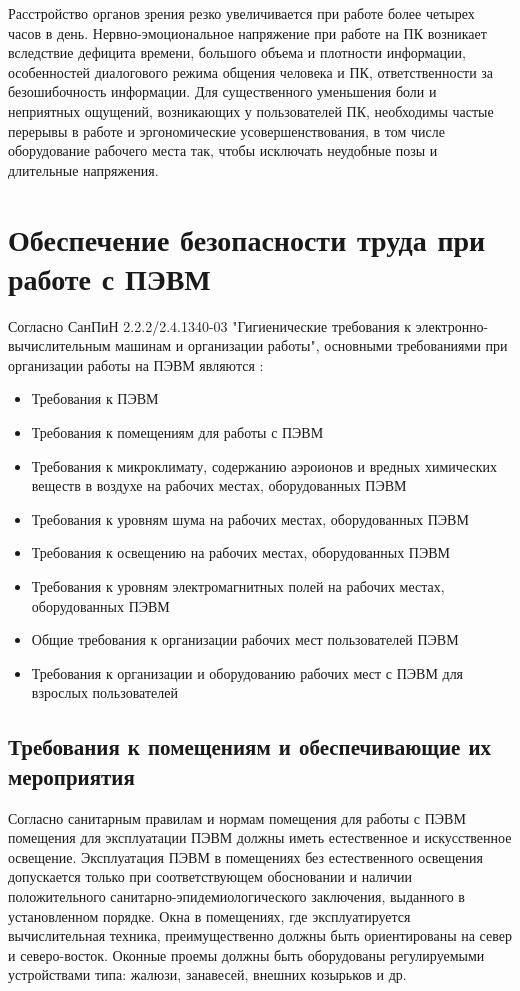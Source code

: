 Расстройство органов зрения резко увеличивается при работе более четырех часов в день. Нервно-эмоциональное напряжение при работе на ПК возникает вследствие дефицита времени, большого объема и плотности информации, особенностей диалогового режима общения человека и ПК, ответственности за безошибочность информации.
Для существенного уменьшения боли и неприятных ощущений, возникающих у пользователей ПК, необходимы частые перерывы в работе и эргономические усовершенствования, в том числе оборудование рабочего места так, чтобы исключать неудобные позы и длительные напряжения.

\section{Обеспечение безопасности труда при работе с ПЭВМ}
Согласно СанПиН 2.2.2/2.4.1340-03 "Гигиенические требования к электронно-вычислительным машинам и организации работы", основными требованиями при организации работы на ПЭВМ являются \cite{sanpin}:
\begin{itemize}
	\item Требования к ПЭВМ
	\item Требования к помещениям для работы с ПЭВМ
	\item Требования к микроклимату, содержанию аэроионов и вредных химических  веществ в воздухе на рабочих местах, оборудованных ПЭВМ
	\item Требования к уровням шума на рабочих местах, оборудованных ПЭВМ	
	\item Требования к освещению на рабочих местах, оборудованных ПЭВМ
	\item Требования к уровням электромагнитных полей на рабочих местах,  оборудованных ПЭВМ
	\item Общие требования к организации рабочих мест пользователей ПЭВМ
	\item Требования к организации и оборудованию рабочих мест с ПЭВМ для  взрослых пользователей
\end{itemize}

\subsection{Требования к помещениям и обеспечивающие их мероприятия}
Согласно санитарным правилам и нормам помещения для работы с ПЭВМ помещения для эксплуатации ПЭВМ должны  иметь естественное и искусственное освещение. Эксплуатация ПЭВМ в помещениях без естественного освещения допускается только при соответствующем  обосновании  и  наличии положительного  санитарно-эпидемиологического  заключения,    выданного в установленном порядке. Окна в помещениях,  где эксплуатируется  вычислительная  техника,  преимущественно  должны   быть ориентированы на север и северо-восток. Оконные проемы должны быть  оборудованы  регулируемыми  устройствами типа: жалюзи, занавесей, внешних козырьков и др.

